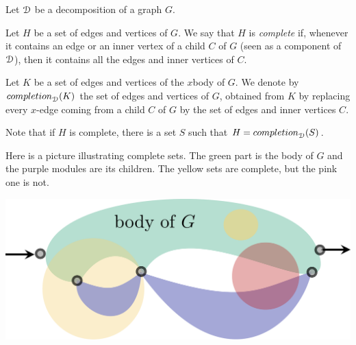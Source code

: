 \begin{definition} Let $\mathcal D$ be a decomposition of a graph $G$. 
\smallskip

Let $H$ be a set of edges and vertices of $G$. We say that $H$ is \emph{complete} if, whenever it contains an edge or an inner vertex of a child $C$ of $G$ (seen as a component of $\mathcal D$), then it contains all the edges and  inner vertices of $C$. 
\smallskip

Let $K$ be a set of edges and vertices of the $x$\text{-}body of $G$.  We denote by $\mathsf{completion}_\cD(K)$ the set of edges and vertices of $G$,  obtained from $K$ by replacing every $x$-edge coming from a child $C$ of $G$  by the set of edges and inner vertices $C$.  
\end{definition}
\begin{remark}
Note that if $H$ is complete, there is a set $S$ such that $H=\mathsf{completion}_\cD(S)$.
\end{remark}

Here is a picture illustrating complete sets. The green part is the body of $G$ and the purple modules are its children. The yellow sets are complete, but the pink one is not. 
\begin{center}
\includegraphics[scale=.12]{Pictures/complete-set}
\end{center}

